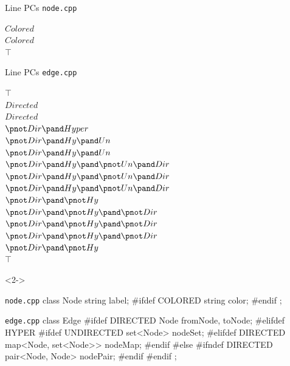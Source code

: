\begin{frame}[t,fragile]{\myframetitle}
\begin{fancycolumns}[t,columns=4,widths={31,20,20,29},animation=none]
{\begin{exampletight}{Line PCs \tiny\texttt{node.cpp}}
\begin{flushright}
					{$Colored$}\\
					{$Colored$}\\
					{$\top$}
				\end{flushright}
			\end{exampletight}
			\begin{exampletight}{Line PCs \tiny\texttt{edge.cpp}}
				\tiny\vspace*{0.5ex}
				\begin{flushright}
					{$\top$}\\
					{$Directed$}\\
					{$Directed$}\\
					{$\pnot Dir \pand Hyper$}\\
					{$\pnot Dir \pand Hy \pand Un$}\\
					{$\pnot Dir \pand Hy \pand Un$}\\
					{$\pnot Dir \pand Hy \pand \pnot Un \pand Dir$}\\
					{$\pnot Dir \pand Hy \pand \pnot Un \pand Dir$}\\
					{$\pnot Dir \pand Hy \pand \pnot Un \pand Dir$}\\
					{$\pnot Dir \pand \pnot Hy$}\\
					{$\pnot Dir \pand \pnot Hy \pand \pnot Dir$}\\
					{$\pnot Dir \pand \pnot Hy \pand \pnot Dir$}\\
					{$\pnot Dir \pand \pnot Hy \pand \pnot Dir$}\\
					{$\pnot Dir \pand \pnot Hy$}\\
					{$\top$}
				\end{flushright}
			\end{exampletight}
		}
	\nextcolumn
		\begin{uncoverenv}<2->
			\begin{cpptight}[basicstyle=\tiny]{\texttt{node.cpp}}
class Node {
	string label;
#ifdef COLORED
	string color;
#endif
};
			\end{cpptight}
			\begin{cpptight}[basicstyle=\tiny]{\texttt{edge.cpp}}
class Edge {
#ifdef DIRECTED
	Node fromNode, toNode;
#elifdef HYPER
#ifdef UNDIRECTED
	set<Node> nodeSet;
#elifdef DIRECTED
	map<Node, set<Node>> nodeMap;
#endif
#else
#ifndef DIRECTED
	pair<Node, Node> nodePair;
#endif
#endif
};
			\end{cpptight}
		\end{uncoverenv}
	\end{fancycolumns}
\end{frame}

